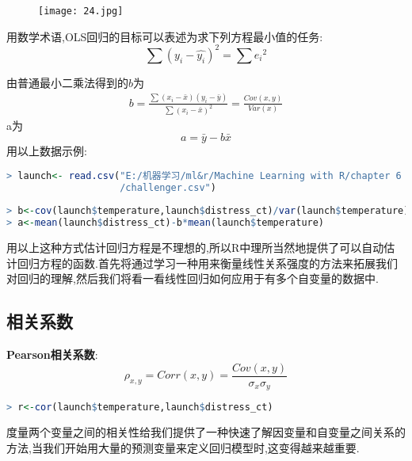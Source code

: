 \documentclass[11pt,a4paper,oneside]{book}
\begin{document}
\begin{figure}[H]
	\centering
	\texttt{[image: 24.jpg]}
\end{figure}

用数学术语,OLS回归的目标可以表述为求下列方程最小值的任务:
\begin{equation}
\sum(y_i-\hat{y_i})^2=\sum {e_i}^2
\end{equation}

由普通最小二乘法得到的$\hat{b}$为
\begin{equation}
\begin{aligned}
b = \frac{\sum(x_i-\bar{x})(y_i-\bar{y})}{\sum(x_i-\bar{x})^2}
= \frac{Cov(x,y)}{Var(x)}
\end{aligned}
\end{equation}
a为
\begin{equation}
a=\bar{y}-b\bar{x}
\end{equation}
用以上数据示例:
\begin{lstlisting}[language=r]
> launch<- read.csv("E:/机器学习/ml&r/Machine Learning with R/chapter 6
                    /challenger.csv")
 
> b<-cov(launch$temperature,launch$distress_ct)/var(launch$temperature)
> a<-mean(launch$distress_ct)-b*mean(launch$temperature)
\end{lstlisting}

用以上这种方式估计回归方程是不理想的,所以R中理所当然地提供了可以自动估计回归方程的函数.首先将通过学习一种用来衡量线性关系强度的方法来拓展我们对回归的理解,然后我们将看一看线性回归如何应用于有多个自变量的数据中.

\subsection{相关系数}
\begin{tcolorbox}[colback=blue!7!white,colframe=blue!40]
\textbf{Pearson相关系数}: 
\begin{equation}
\rho_{x,y}=Corr(x,y)=\frac{Cov(x,y)}{\sigma_x\sigma_y}
\end{equation}
\end{tcolorbox}
\begin{lstlisting}[language=r]
> r<-cor(launch$temperature,launch$distress_ct)
\end{lstlisting}
度量两个变量之间的相关性给我们提供了一种快速了解因变量和自变量之间关系的方法,当我们开始用大量的预测变量来定义回归模型时,这变得越来越重要.
\end{document}

